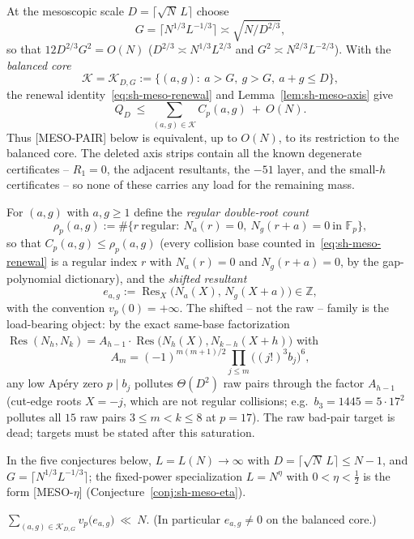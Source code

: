 \begin{remark}\label{rem:sh-meso-core}
At the mesoscopic scale $D=\lceil\sqrt N\,L\rceil$ choose
\[
 G=\bigl\lceil N^{1/3}L^{-1/3}\bigr\rceil
 \asymp\sqrt{N/D^{2/3}} ,
\]
so that $12D^{2/3}G^2=O(N)$
($D^{2/3}\asymp N^{1/3}L^{2/3}$ and $G^2\asymp N^{2/3}L^{-2/3}$).
With the \emph{balanced core}
\[
 \mathcal K=\mathcal K_{D,G}
 :=\{(a,g):\ a>G,\ g>G,\ a+g\le D\},
\]
the renewal identity~\eqref{eq:sh-meso-renewal} and
Lemma~\ref{lem:sh-meso-axis} give
\[
 Q_D\ \le\ \sum_{(a,g)\in\mathcal K}C_p(a,g)\ +\ O(N).
\]
Thus [MESO-PAIR] below is equivalent, up to $O(N)$, to its restriction
to the balanced core.  The deleted axis strips contain all the known
degenerate certificates -- $R_1=0$, the adjacent resultants, the $-51$
layer, and the small-$h$ certificates -- so none of these carries any
load for the remaining mass.
\end{remark}

For $(a,g)$ with $a,g\ge1$ define the \emph{regular double-root count}
\[
 \rho_p(a,g):=\#\{r\ \text{regular}:\ N_a(r)=0,\ N_g(r+a)=0
 \ \text{in }\mathbb F_p\},
\]
so that $C_p(a,g)\le\rho_p(a,g)$ (every collision base counted
in~\eqref{eq:sh-meso-renewal} is a regular index $r$ with $N_a(r)=0$
and $N_g(r+a)=0$, by the gap-polynomial dictionary), and the
\emph{shifted resultant}
\[
 e_{a,g}:=\operatorname{Res}_X\bigl(N_a(X),\,N_g(X+a)\bigr)\in\mathbb Z,
\]
with the convention $v_p(0)=+\infty$.  The shifted -- not the raw --
family is the load-bearing object: by the exact same-base
factorization
$\operatorname{Res}(N_h,N_k)=A_{h-1}\cdot
\operatorname{Res}\bigl(N_h(X),N_{k-h}(X+h)\bigr)$ with
\[
 A_m=(-1)^{m(m+1)/2}\prod_{j\le m}\bigl((j!)^3b_j\bigr)^6,
\]
any low Ap\'ery zero $p\mid b_j$ pollutes $\Theta(D^2)$ raw pairs
through the factor $A_{h-1}$ (cut-edge roots $X=-j$, which are not
regular collisions; e.g.\ $b_3=1445=5\cdot17^2$ pollutes all $15$ raw
pairs $3\le m<k\le8$ at $p=17$).  The raw bad-pair target is dead;
targets must be stated after this saturation.

In the five conjectures below, $L=L(N)\to\infty$ with
$D=\lceil\sqrt N\,L\rceil\le N-1$, and
$G=\lceil N^{1/3}L^{-1/3}\rceil$; the fixed-power specialization
$L=N^{\eta}$ with $0<\eta<\tfrac12$ is the form [MESO-$\eta$]
(Conjecture~\ref{conj:sh-meso-eta}).

\begin{conjecture}
\label{conj:sh-meso-shifted-valuation}
$\displaystyle
\sum_{(a,g)\in\mathcal K_{D,G}}v_p\bigl(e_{a,g}\bigr)\ \ll\ N .$
(In particular $e_{a,g}\ne0$ on the balanced core.)
\end{conjecture}

